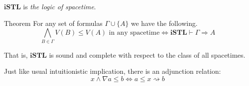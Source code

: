 \documentclass{beamer}
\begin{document}


\begin{frame}{\subSemantics}
	$\mathbf{iSTL}$ is \emph{the logic of spacetime}.

	\begin{block}{Theorem}
		For any set of formulas $\Gamma \cup \{ A \}$ we have the following.
		\[ \bigwedge_{B \in \Gamma} V(B) \leq V(A) \text{ in any spacetime} \iff \mathbf{iSTL} \vdash \Gamma \Rightarrow A \]

		That is, $\mathbf{iSTL}$ is sound and complete with respect to the class of all spacetimes. \cite{amir}
		\vspace{1ex}
	\end{block}

	Just like usual intuitionistic implication, there is an adjunction relation:
	\[ x \wedge \nabla a \leq b \iff a \leq x \rightsquigarrow b \]
\end{frame}
\end{document}
